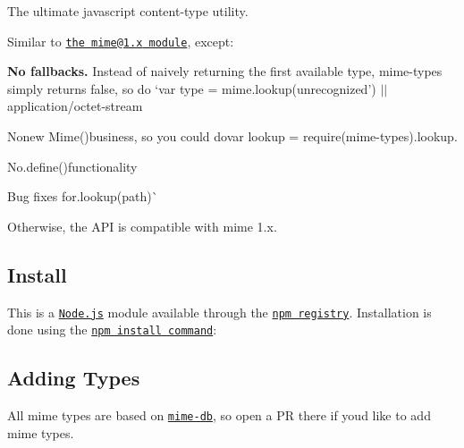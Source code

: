 \href{https://npmjs.org/package/mime-types}{\tt } \href{https://npmjs.org/package/mime-types}{\tt } \href{https://nodejs.org/en/download}{\tt } \href{https://travis-ci.org/jshttp/mime-types}{\tt } \href{https://coveralls.io/r/jshttp/mime-types?branch=master}{\tt }

The ultimate javascript content-\/type utility.

Similar to \href{https://www.npmjs.com/package/mime}{\tt the {\ttfamily mime@1.\+x} module}, except\+:


\begin{DoxyItemize}
\item {\bfseries No fallbacks.} Instead of naively returning the first available type, {\ttfamily mime-\/types} simply returns {\ttfamily false}, so do `var type = mime.\+lookup(\textquotesingle{}unrecognized') $\vert$$\vert$ \textquotesingle{}application/octet-\/stream
\item {\ttfamily No}new Mime(){\ttfamily business, so you could do}var lookup = require(\textquotesingle{}mime-\/types\textquotesingle{}).lookup{\ttfamily .}
\item {\ttfamily No}.define(){\ttfamily functionality}
\item {\ttfamily Bug fixes for}.lookup(path)\`{}
\end{DoxyItemize}

Otherwise, the A\+PI is compatible with {\ttfamily mime} 1.\+x.

\subsection*{Install}

This is a \href{https://nodejs.org/en/}{\tt Node.\+js} module available through the \href{https://www.npmjs.com/}{\tt npm registry}. Installation is done using the \href{https://docs.npmjs.com/getting-started/installing-npm-packages-locally}{\tt {\ttfamily npm install} command}\+:




\subsection*{Adding Types}

All mime types are based on \href{https://www.npmjs.com/package/mime-db}{\tt mime-\/db}, so open a PR there if you\textquotesingle{}d like to add mime types.

